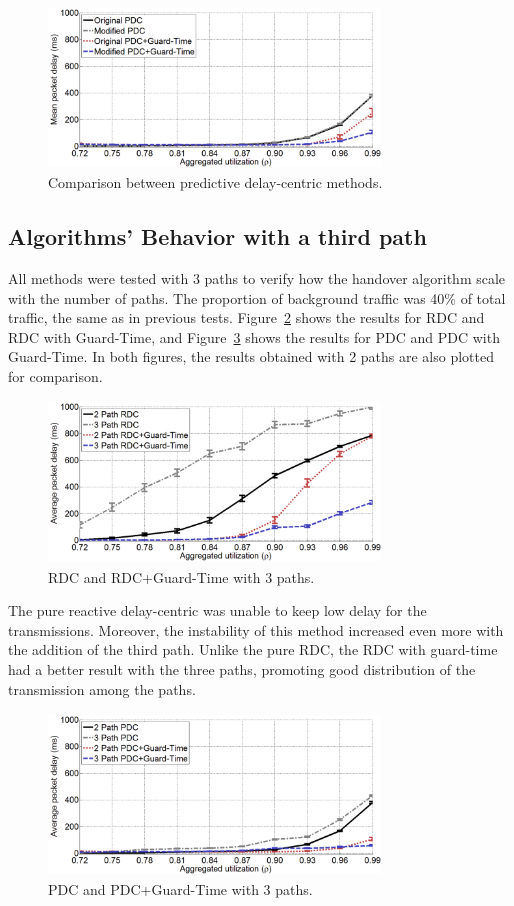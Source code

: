 \documentclass{sbrt2015}
\begin{document}
\begin{figure}[h!]
	\centering
	\includegraphics[width=8.8cm,height=4.3cm]{figura7}
	\caption{Comparison between predictive delay-centric methods.}
	\label{figura7}
\end{figure}

\subsection{Algorithms' Behavior with a third path}
All methods were tested with 3 paths to verify how the handover algorithm scale with the number of paths.
The proportion of background traffic was 40\% of total traffic, the same as in previous tests. 
Figure~\ref{figura8} shows the results for RDC and RDC with Guard-Time, and Figure~\ref{figura9} shows the results for PDC and PDC with Guard-Time. 
In both figures, the results obtained with 2 paths are also plotted for comparison.


\begin{figure}[h!]
	\centering
	\includegraphics[width=8.8cm,height=4.3cm]{figura8}
	\caption{RDC and RDC+Guard-Time with 3 paths.}
	\label{figura8}
\end{figure}

The pure reactive delay-centric was unable to keep low delay for the transmissions. 
Moreover, the instability of this method increased even more with the addition of the third path.
Unlike the pure RDC, the RDC with guard-time had a better result with the three paths, promoting good distribution of the
transmission among the paths.

\begin{figure}[h!]
	\centering
	\includegraphics[width=8.8cm,height=4.3cm]{figura9}
	\caption{PDC and PDC+Guard-Time with 3 paths.}
	\label{figura9}
\end{figure}
\end{document}
